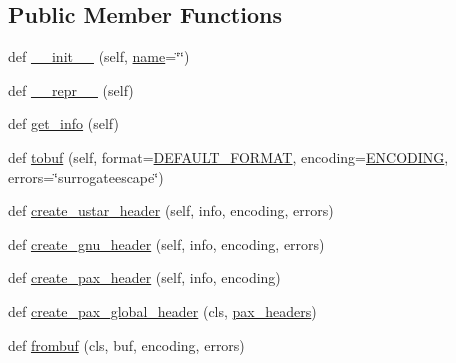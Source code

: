 \subsection*{Public Member Functions}
\begin{DoxyCompactItemize}
\item 
def \hyperlink{classpip_1_1__vendor_1_1distlib_1_1__backport_1_1tarfile_1_1TarInfo_a98917e3c6098b5d46516276870f62711}{\+\_\+\+\_\+init\+\_\+\+\_\+} (self, \hyperlink{classpip_1_1__vendor_1_1distlib_1_1__backport_1_1tarfile_1_1TarInfo_a2a4171afa2c64ccfe9351f3bb4bb95be}{name}=\char`\"{}\char`\"{})
\item 
def \hyperlink{classpip_1_1__vendor_1_1distlib_1_1__backport_1_1tarfile_1_1TarInfo_ae9a98e2c34772fa848793fc504fea9b5}{\+\_\+\+\_\+repr\+\_\+\+\_\+} (self)
\item 
def \hyperlink{classpip_1_1__vendor_1_1distlib_1_1__backport_1_1tarfile_1_1TarInfo_ac311a318b8e06b37fee6c39739d2fa42}{get\+\_\+info} (self)
\item 
def \hyperlink{classpip_1_1__vendor_1_1distlib_1_1__backport_1_1tarfile_1_1TarInfo_a08bb83dcbd0061866526b4a8023b08fc}{tobuf} (self, format=\hyperlink{namespacepip_1_1__vendor_1_1distlib_1_1__backport_1_1tarfile_a6e93052e6cf6ea79fc8275a58ea1a560}{D\+E\+F\+A\+U\+L\+T\+\_\+\+F\+O\+R\+M\+AT}, encoding=\hyperlink{namespacepip_1_1__vendor_1_1distlib_1_1__backport_1_1tarfile_ae0596a9ced2176d37274c9d280d688c8}{E\+N\+C\+O\+D\+I\+NG}, errors=\char`\"{}surrogateescape\char`\"{})
\item 
def \hyperlink{classpip_1_1__vendor_1_1distlib_1_1__backport_1_1tarfile_1_1TarInfo_a67be9a4a0da5cb775d4fea6562831ad8}{create\+\_\+ustar\+\_\+header} (self, info, encoding, errors)
\item 
def \hyperlink{classpip_1_1__vendor_1_1distlib_1_1__backport_1_1tarfile_1_1TarInfo_adf3483c743b1c86b6d3b7da825bcbbdf}{create\+\_\+gnu\+\_\+header} (self, info, encoding, errors)
\item 
def \hyperlink{classpip_1_1__vendor_1_1distlib_1_1__backport_1_1tarfile_1_1TarInfo_af075da28e3c077420ef7519acf212e68}{create\+\_\+pax\+\_\+header} (self, info, encoding)
\item 
def \hyperlink{classpip_1_1__vendor_1_1distlib_1_1__backport_1_1tarfile_1_1TarInfo_a46dfd8eed4be4c4248351949ec9e68d2}{create\+\_\+pax\+\_\+global\+\_\+header} (cls, \hyperlink{classpip_1_1__vendor_1_1distlib_1_1__backport_1_1tarfile_1_1TarInfo_aabcf4d12a0f476f8031092ccf75920d4}{pax\+\_\+headers})
\item 
def \hyperlink{classpip_1_1__vendor_1_1distlib_1_1__backport_1_1tarfile_1_1TarInfo_ab2d30d7e4482c69cbd7ab4193d6a9140}{frombuf} (cls, buf, encoding, errors)

\end{DoxyCompactItemize}
